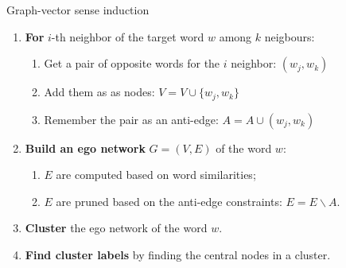 \begin{frame}{ Graph-vector sense induction }

\begin{enumerate}
\item \textbf{For} $i$-th neighbor of the target word $w$ among $k$ neigbours:

\begin{enumerate}
	\item Get a pair of opposite words for the $i$ neighbor: $(w_j, w_k)$
	\item Add them as as nodes: $V = V \cup \{w_j, w_k\}$
	\item Remember the pair as an anti-edge: $A = A \cup (w_j, w_k)$
\end{enumerate}

\pause 

\item \textbf{Build an ego network} $G = (V, E)$ of the word $w$:
\begin{enumerate}

\item $E$ are computed based on word similarities;
\item $E$ are pruned based on the anti-edge constraints: $E = E \smallsetminus
 A$.
	
\end{enumerate}

\pause 

\item \textbf{Cluster} the ego network of the word $w$.

\pause 

\item \textbf{Find cluster labels} by finding the central nodes in a cluster.

\end{enumerate}

\end{frame}






